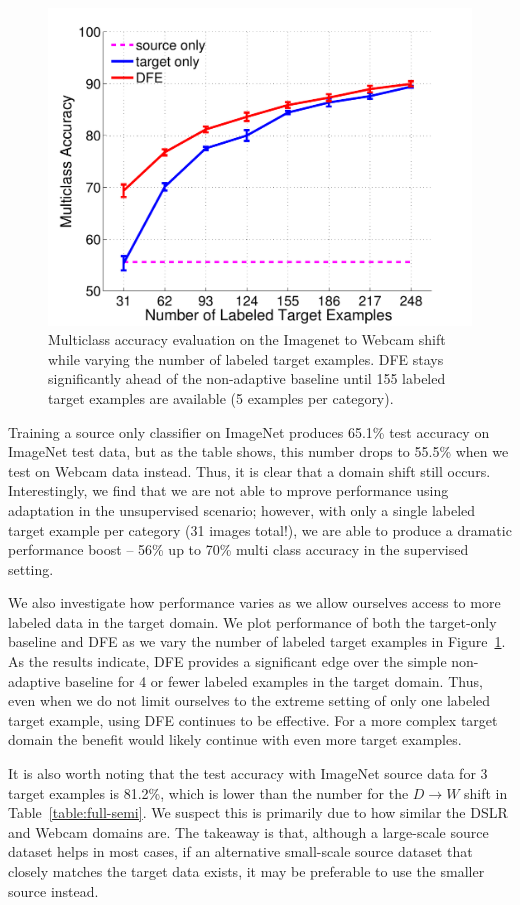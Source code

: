 \begin{figure}
  \vspace{-3em}
  \begin{center}
  \includegraphics[width=.45\textwidth]{figs/imagenet_webcam_vary_num_target_examples}
  \end{center}
  \caption{Multiclass accuracy evaluation on the Imagenet to Webcam shift while varying the number of labeled target examples. DFE stays significantly ahead of the non-adaptive baseline until 155 labeled target examples are available (5 examples per category).}
  \label{fig:vary_num_target}
\end{figure}

Training a source only classifier on ImageNet produces 65.1\% test accuracy on ImageNet test data, but as the table shows, this number drops to 55.5\% when we test on Webcam data instead. Thus, it is clear that a domain shift still occurs.
Interestingly, we find that we are not able to mprove performance using adaptation in the unsupervised scenario; however, with only a single labeled target example per category (31 images total!), we are able to produce a dramatic performance boost -- 56\% up to 70\% multi class accuracy in the supervised setting.

We also investigate how performance varies as we allow ourselves access to more labeled data in the target domain. We plot performance of both the target-only baseline and DFE as we vary the number of labeled target examples in Figure~\ref{fig:vary_num_target}.
As the results indicate, DFE provides a significant edge over the simple non-adaptive baseline for 4 or fewer labeled examples in the target domain. Thus, even when we do not limit ourselves to the extreme setting of only one labeled target example, using DFE continues to be effective. For a more complex target domain the benefit would likely continue with even more target examples.

It is also worth noting that the test accuracy with ImageNet source data for 3 target examples is 81.2\%, which is lower than the number for the $D \rightarrow W$ shift in Table~\ref{table:full-semi}.
We suspect this is primarily due to how similar the DSLR and Webcam domains are.
The takeaway is that, although a large-scale source dataset helps in most cases, if an alternative small-scale source dataset that closely matches the target data exists, it may be preferable to use the smaller source instead.

